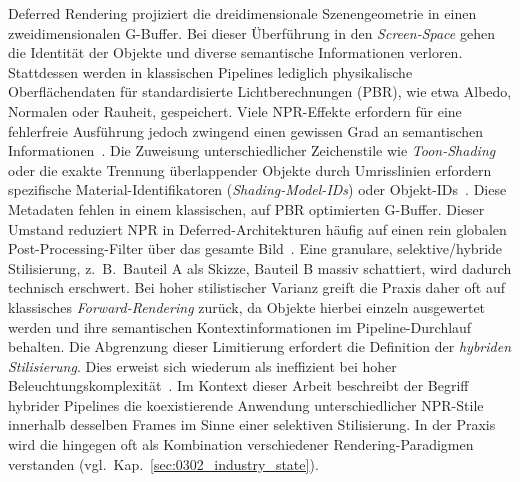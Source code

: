 Deferred Rendering projiziert die dreidimensionale Szenengeometrie in einen zweidimensionalen \ac{G-Buffer}.
Bei dieser Überführung in den \textit{Screen-Space} gehen die Identität der Objekte und diverse semantische
Informationen verloren.
Stattdessen werden in klassischen Pipelines lediglich physikalische Oberflächendaten für standardisierte
Lichtberechnungen (\ac{PBR}), wie etwa Albedo, Normalen oder Rauheit, gespeichert.
Viele \ac{NPR}-Effekte erfordern für eine fehlerfreie Ausführung jedoch zwingend einen gewissen Grad an semantischen
Informationen~\parencite[vgl.][Abschn.~2.1 u.~3.3.2]{fonsecaDeferredShadingTutorial}.
Die Zuweisung unterschiedlicher Zeichenstile wie \textit{Toon-Shading} oder die exakte Trennung überlappender Objekte
durch Umrisslinien erfordern spezifische Material-Identifikatoren (\textit{Shading-Model-IDs}) oder
Objekt-IDs~\parencites(vgl.)()[Kap.~15.2.3]{akenine-mollerRealtimeRendering2019}
[Folie~\textit{Our GBuffer Layout}]{gameworksToonRenderingHiFi}.
Diese Metadaten fehlen in einem klassischen, auf \ac{PBR} optimierten \ac{G-Buffer}.
Dieser Umstand reduziert \ac{NPR} in Deferred-Architekturen häufig auf einen rein globalen Post-Processing-Filter über
das gesamte Bild~\parencite[vgl.][Abschn.~1]{magdicsPostprocessingNPREffects2013}.
Eine granulare, selektive/hybride Stilisierung, z.~B.\ Bauteil A als Skizze, Bauteil B massiv schattiert, wird dadurch
technisch erschwert.
Bei hoher stilistischer Varianz greift die Praxis daher oft auf klassisches \textit{Forward-Rendering} zurück, da
Objekte hierbei einzeln ausgewertet werden und ihre semantischen Kontextinformationen im Pipeline-Durchlauf behalten.
Die Abgrenzung dieser Limitierung erfordert die Definition der \textit{hybriden Stilisierung}.
Dies erweist sich wiederum als ineffizient bei hoher
Beleuchtungskomplexität~\parencite[vgl.][Abschn.~1]{haradaForwardBringingDeferred2012}.
Im Kontext dieser Arbeit beschreibt der Begriff hybrider Pipelines die koexistierende Anwendung unterschiedlicher
\ac{NPR}-Stile innerhalb desselben Frames im Sinne einer selektiven Stilisierung.
In der Praxis wird die  hingegen oft als Kombination verschiedener
Rendering-Paradigmen verstanden (vgl.\ Kap.~\ref{sec:0302_industry_state}).


